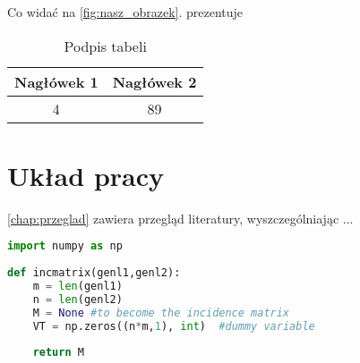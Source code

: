 Co widać na \cref{fig:nasz_obrazek}.  prezentuje

\begin{table}[b]%
    \centering
    \caption{Podpis tabeli}
    \begin{tabular}{|c|c||}
        \hline
        \textbf{Nagłówek 1} & \textbf{Nagłówek 2 } \\ \hline
        4 & 89  \\ \hline
    \end{tabular}
    \label{tab:nasza_tabela}
\end{table}
\section{Układ pracy}

\cref{chap:przeglad} zawiera przegląd literatury, wyszczególniając ...

\begin{minipage}{\linewidth} %
\begin{lstlisting}[language=Python,caption={Opis kodu},captionpos=b,label={lst:kod}]
import numpy as np
    
def incmatrix(genl1,genl2):
    m = len(genl1)
    n = len(genl2)
    M = None #to become the incidence matrix
    VT = np.zeros((n*m,1), int)  #dummy variable
    
    return M
\end{lstlisting}
\end{minipage}